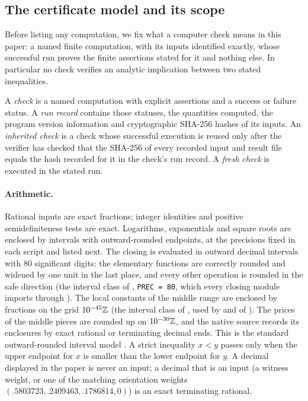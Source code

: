 \subsection{The certificate model and its scope}\label{subsec:cert:model}

Before listing any computation, we fix what a computer check means
in this paper: a named finite computation, with its inputs
identified exactly, whose successful run proves the finite
assertions stated for it and nothing else. In particular no check
verifies an analytic implication between two stated inequalities.

\begin{definition}\label{def:cert:record}
A \emph{check} is a named computation with explicit assertions and a
success or failure status. A \emph{run record} contains those statuses,
the quantities computed, the program version information and cryptographic
SHA-256 hashes of its inputs. An \emph{inherited check} is a check whose
successful execution is reused only after the verifier has checked
that the SHA-256 of every recorded input and result file equals the
hash recorded for it in the check's run record. A \emph{fresh check} is executed
in the stated run.
\end{definition}

\paragraph{Arithmetic.}
Rational inputs are exact fractions; integer identities and positive
semidefiniteness tests are exact. Logarithms, exponentials and square roots
are enclosed by intervals with outward-rounded endpoints, at the
precisions fixed in each script and listed next. The closing is evaluated in outward decimal intervals with
$80$ significant digits: the elementary functions are correctly rounded and
widened by one unit in the last place, and every other operation is rounded in
the safe direction (the interval class of
,
\texttt{PREC = 80}, which every closing module imports through
). The local constants
of the middle range are enclosed by fractions on the grid $10^{-45}\mathbb Z$ (the
interval class of ,
used by  and  of
). The prices of the middle pieces are
rounded up on $10^{-30}\mathbb Z$, and the native source records its enclosures by
exact rational or terminating decimal ends. This is the standard outward-rounded interval model
\cite{MooreKearfottCloud09,Neumaier90}. A strict inequality $x<y$ passes only
when the upper endpoint for $x$ is smaller than the lower endpoint for $y$. A
decimal displayed in the paper is never an input; a decimal that is an input (a
witness weight, or one of the matching orientation weights
$(.5803723,.2409463,.1786814,0)$) is an exact terminating rational.

